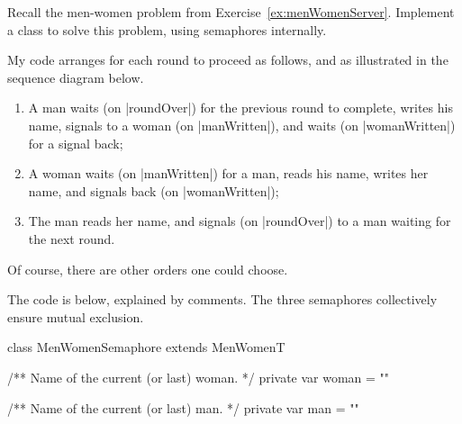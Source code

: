 \begin{question}
Recall the men-women problem from Exercise~\ref{ex:menWomenServer}.  Implement
a class to solve this problem, using semaphores internally.
\end{question}


\begin{answerI}
My code arranges for each round to proceed as follows, and as illustrated in
the sequence diagram below.
%
\begin{enumerate}
\item[1.] A man waits (on |roundOver|) for the previous round to complete,
  writes his name, signals to a woman (on |manWritten|), and waits (on
  |womanWritten|) for a signal back;

\item[2.] A woman waits (on |manWritten|) for a man, reads his name, writes her
name, and signals back (on |womanWritten|);

\item[3.] The man reads her name, and signals (on |roundOver|) to a man
  waiting for the next round.
\end{enumerate}
%
\begin{center}
\end{center}
%
Of course, there are other orders one could choose.

The code is below, explained by comments.  The three semaphores collectively
ensure mutual exclusion. 
%
\begin{scala}
class MenWomenSemaphore extends MenWomenT{
  /** Name of the current (or last) woman. */
  private var woman = ""

  /** Name of the current (or last) man. */
  private var man = ""

}
\end{scala}
\end{answerI}
